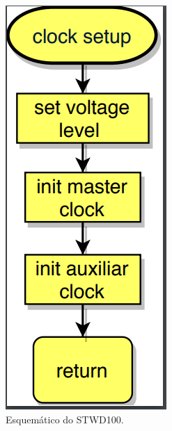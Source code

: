 \begin{apendicesenv}
\begin{figure}[!h]
	\centerfloat
	\centering
	\includegraphics[keepaspectratio=true,scale=0.5]{figuras/flowChart_clockSetup.PNG}
	\caption{Esquemático do STWD100.}
	\label{flowChart_clockSetup}
\end{figure}


\end{apendicesenv}
